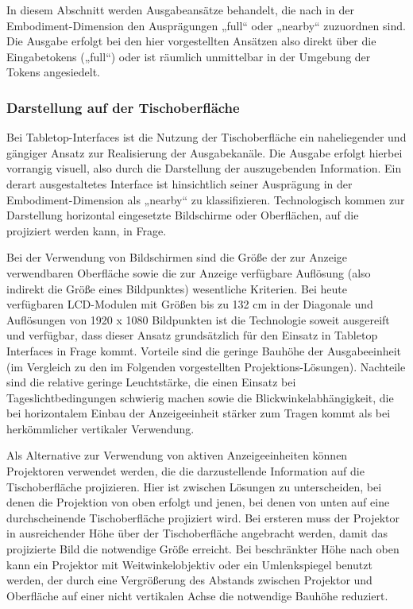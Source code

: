 In diesem Abschnitt werden Ausgabeansätze behandelt, die nach \citep{Fishkin04} in der Embodiment-Dimension den Ausprägungen „full“ oder „nearby“ zuzuordnen sind. Die Ausgabe erfolgt bei den hier vorgestellten Ansätzen also direkt über die Eingabetokens („full“) oder ist räumlich unmittelbar in der Umgebung der Tokens angesiedelt.

\subsubsection{Darstellung auf der Tischoberfläche} %
\label{ssub:darstellung_auf_der_tischoberfläche}

Bei Tabletop-Interfaces ist die Nutzung der Tischoberfläche ein naheliegender und gängiger  Ansatz zur Realisierung der Ausgabekanäle. Die Ausgabe erfolgt hierbei vorrangig visuell, also durch die Darstellung der auszugebenden Information. Ein derart ausgestaltetes Interface ist hinsichtlich seiner Ausprägung in der Embodiment-Dimension als „nearby“ zu klassifizieren. Technologisch kommen zur Darstellung horizontal eingesetzte Bildschirme oder Oberflächen, auf die projiziert werden kann, in Frage.

Bei der Verwendung von Bildschirmen sind die Größe der zur Anzeige verwendbaren Oberfläche sowie die zur Anzeige verfügbare Auflösung (also indirekt die Größe eines Bildpunktes) wesentliche Kriterien. Bei heute verfügbaren \gls{LCD}-Modulen mit Größen bis zu 132 cm in der Diagonale und Auflösungen von 1920 x 1080 Bildpunkten ist die Technologie soweit ausgereift und verfügbar, dass dieser Ansatz grundsätzlich für den Einsatz in Tabletop Interfaces in Frage kommt. Vorteile sind die geringe Bauhöhe der Ausgabeeinheit (im Vergleich zu den im Folgenden vorgestellten Projektions-Lösungen). Nachteile sind die relative geringe Leuchtstärke, die einen Einsatz bei Tageslichtbedingungen schwierig machen sowie die Blickwinkelabhängigkeit, die bei horizontalem Einbau der Anzeigeeinheit stärker zum Tragen kommt als bei herkömmlicher vertikaler Verwendung.

Als Alternative zur Verwendung von aktiven Anzeigeeinheiten können Projektoren verwendet werden, die die darzustellende Information auf die Tischoberfläche projizieren. Hier ist zwischen Lösungen zu unterscheiden, bei denen die Projektion von oben erfolgt und jenen, bei denen von unten auf eine durchscheinende Tischoberfläche projiziert wird. Bei ersteren muss der Projektor in ausreichender Höhe über der Tischoberfläche angebracht werden, damit das projizierte Bild die notwendige Größe erreicht. Bei beschränkter Höhe nach oben kann ein Projektor mit Weitwinkelobjektiv oder ein Umlenkspiegel benutzt werden, der durch eine Vergrößerung des Abstands zwischen Projektor und Oberfläche auf einer nicht vertikalen Achse die notwendige Bauhöhe reduziert. 


